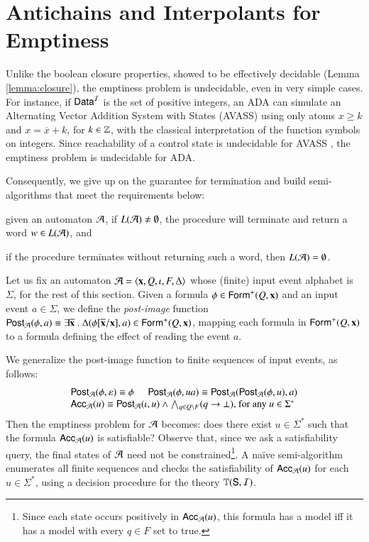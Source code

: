 \documentclass[10pt,conference,letterpaper,twocolumn]{IEEEtran}
\begin{document}
\section{Antichains and Interpolants for Emptiness}

Unlike the boolean closure properties, showed to be effectively
decidable (Lemma \ref{lemma:closure}), the emptiness problem is
undecidable, even in very simple cases. For instance, if $\mathsf{Data}^{\mathcal{I}}$ is
the set of positive integers, an ADA can simulate an Alternating
Vector Addition System with States (AVASS) \cite{LazicSchmitz14} using
only atoms $x \geq k$ and $x = \overline{x} + k$, for $k \in {\bf \mathbb{Z}}$,
with the classical interpretation of the function symbols on
integers. Since reachability of a control state is undecidable for
AVASS \cite{LINCOLN92}, the emptiness problem is undecidable for ADA.

Consequently, we give up on the guarantee for termination and build
semi-algorithms that meet the requirements below: \begin{compactenum}[(i)]
\item given an automaton $\mathcal{A}$, if $L(\mathcal{A}) \neq\emptyset$, the procedure
  will terminate and return a word $w \in L(\mathcal{A})$, and
%
\item if the procedure terminates without returning such a word, then
  $L(\mathcal{A}) = \emptyset$.
\end{compactenum}

Let us fix an automaton $\mathcal{A} = \left\langle \mathbf x,Q,\iota,F,\Delta \right\rangle$ whose
(finite) input event alphabet is $\Sigma$, for the rest of this
section. Given a formula $\phi \in \mathsf{Form}^+(Q,\mathbf x)$ and an input
event $a \in \Sigma$, we define the \emph{post-image} function
$\mathsf{Post}_{\mathcal{A}}(\phi,a) \equiv \exists \overline{\mathbf x} ~.~
\Delta(\phi[\overline{\mathbf x}/\mathbf x], a) \in \mathsf{Form}^+(Q,\mathbf x)$,
mapping each formula in $\mathsf{Form}^+(Q,\mathbf x)$ to a formula defining the
effect of reading the event $a$.

We generalize the post-image function to finite sequences of input
events, as follows:
\[\begin{array}{l}
\mathsf{Post}_{\mathcal{A}}(\phi,\varepsilon) \equiv \phi \hspace*{5mm} \mathsf{Post}_{\mathcal{A}}(\phi,ua) \equiv \mathsf{Post}_{\mathcal{A}}(\mathsf{Post}_{\mathcal{A}}(\phi,u),a) \\
\mathsf{Acc}_{\mathcal{A}}(u) \equiv \mathsf{Post}_{\mathcal{A}}(\iota,u) \wedge \bigwedge_{q \in Q \setminus F} (q \rightarrow \bot)\text{, for any $u \in \Sigma^*$}
\end{array}\]
Then the emptiness problem for $\mathcal{A}$ becomes: does there exist $u \in
\Sigma^*$ such that the formula $\mathsf{Acc}_{\mathcal{A}}(u)$ is satisfiable?
Observe that, since we ask a satisfiability query, the final states of
$\mathcal{A}$ need not be constrained\footnote{ Since each state occurs
  positively in $\mathsf{Acc}_{\mathcal{A}}(u)$, this formula has a model iff it has
  a model with every $q \in F$ set to true.}. A na\"ive semi-algorithm
enumerates all finite sequences and checks the satisfiability of
$\mathsf{Acc}_{\mathcal{A}}(u)$ for each $u \in \Sigma^*$, using a decision procedure
for the theory $\mathbb{T}(\mathsf{S},\mathcal{I})$.
\end{document}
